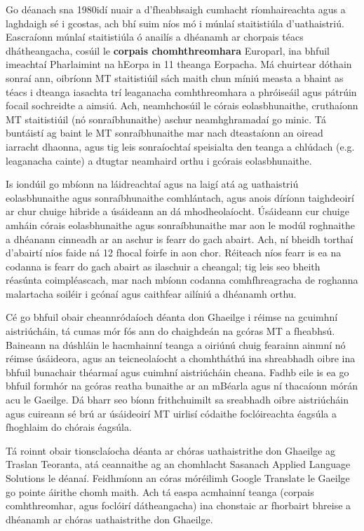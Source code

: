 \begin{multicols}{2}
Go déanach sna 1980idí nuair a d’fheabhsaigh cumhacht ríomhaireachta agus a laghdaigh sé i gcostas, ach bhí suim níos mó i múnlaí staitistiúla d’uathaistriú. Eascraíonn múnlaí staitistiúla ó anailís a dhéanamh ar chorpais téacs dhátheangacha, cosúil le \textbf{corpais chomhthreomhara} Europarl, ina bhfuil imeachtaí Pharlaimint na hEorpa in 11 theanga Eorpacha. Má chuirtear dóthain sonraí ann, oibríonn MT staitistiúil sách maith chun míniú measta a bhaint as téacs i dteanga iasachta trí leaganacha comhthreomhara a phróiseáil agus pátrúin focail sochreidte a aimsiú. Ach, neamhchosúil le córais eolasbhunaithe, cruthaíonn MT staitistiúil (nó sonraíbhunaithe) aschur neamhghramadaí go minic. Tá buntáistí ag baint le MT sonraíbhunaithe mar nach dteastaíonn an oiread iarracht dhaonna, agus tig leis sonraíochtaí speisialta den teanga a chlúdach (e.g. leaganacha cainte) a dtugtar neamhaird orthu i gcórais eolasbhunaithe. 

Is iondúil go mbíonn na láidreachtaí agus na laigí atá ag uathaistriú eolasbhunaithe agus sonraíbhunaithe comhlántach, agus anois díríonn taighdeoirí ar chur chuige hibride a úsáideann an dá mhodheolaíocht. Úsáideann cur chuige amháin córais eolasbhunaithe agus sonraíbhunaithe mar aon le modúl roghnaithe a dhéanann cinneadh ar an aschur is fearr do gach abairt. Ach, ní bheidh torthaí d'abairtí níos faide ná 12 fhocal foirfe in aon chor. Réiteach níos fearr is ea na codanna is fearr do gach abairt as ilaschuir a cheangal; tig leis seo bheith réasúnta coimpléascach, mar nach mbíonn codanna comhfhreagracha de roghanna malartacha soiléir i gcónaí agus caithfear ailíniú a dhéanamh orthu. 


Cé go bhfuil obair cheannródaíoch déanta don Ghaeilge i réimse na gcuimhní aistriúcháin, tá cumas mór fós ann do chaighdeán na gcóras MT a fheabhsú. Baineann na dúshláin le hacmhainní teanga a oiriúnú chuig fearainn ainmní nó réimse úsáideora, agus an teicneolaíocht a chomhtháthú ina shreabhadh oibre ina bhfuil bunachair théarmaí agus cuimhní aistriúcháin cheana. Fadhb eile is ea go bhfuil formhór na gcóras reatha bunaithe ar an mBéarla agus ní thacaíonn mórán acu le Gaeilge. Dá bharr seo bíonn frithchuimilt sa sreabhadh oibre aistriúcháin agus cuireann sé brú ar úsáideoirí MT uirlisí códaithe foclóireachta éagsúla a fhoghlaim do chórais éagsúla. 


Tá roinnt obair tionsclaíocha déanta ar chóras uathaistrithe don Ghaeilge ag Traslan Teoranta, atá ceannaithe ag an chomhlacht Sasanach Applied Language Solutions le déanaí. Feidhmíonn an córas móréilimh Google Translate le Gaeilge go pointe áirithe chomh maith. Ach tá easpa acmhainní teanga (corpais comhthreomhar, agus foclóirí dátheangacha) ina chonstaic ar fhorbairt bhreise a dhéanamh ar chóras uathaistrithe don Ghaeilge.


\end{multicols}
